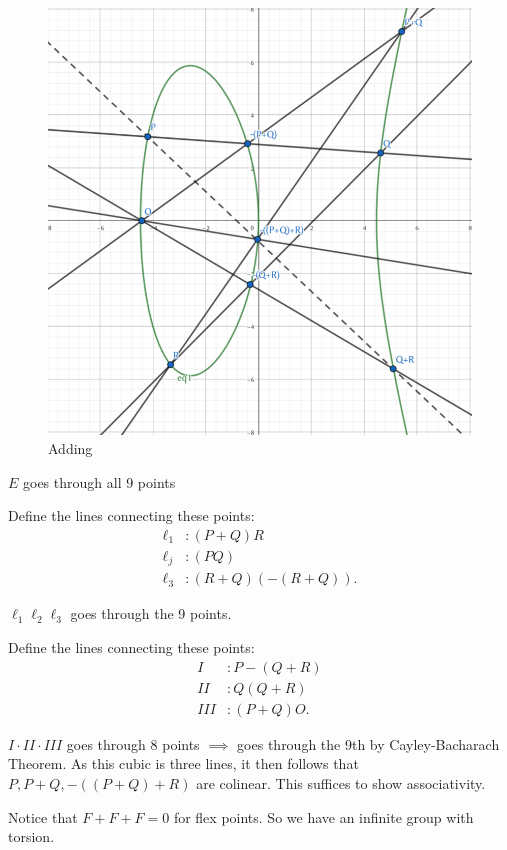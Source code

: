 \documentclass[12pt]{article}
\begin{document}
\begin{figure}
	\centering
	\includegraphics[width=\textwidth]{eass}
	\caption{Adding \label{fig:eass}}
\end{figure}

$E$ goes through all 9 points

Define the lines connecting these points:
\begin{align*}
	\ell_1&:(P+Q)R\\
	\ell_j&:(PQ)\\
	\ell_3&:(R+Q)(-(R+Q))
.\end{align*}

$\ell_1 \ell_2 \ell_3$ goes through the 9 points.

Define the lines connecting these points:
\begin{align*}
	I&: P-(Q+R)\\
	II&: Q(Q+R)\\
	III&: (P+Q)O
.\end{align*}

$I\cdot II\cdot III$ goes through 8 points $\implies$ goes through the 9th by Cayley-Bacharach Theorem.
As this cubic is three lines, it then follows that $P, P+Q, -((P+Q)+R) $ are colinear.
This suffices to show associativity.

Notice that $F+F+F = 0 $ for flex points.
So we have an infinite group with torsion.
\end{document}
